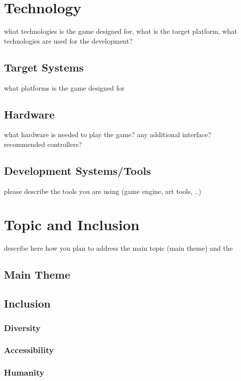 \documentclass[a4paper]{scrreprt}
\begin{document}
\chapter{Technology}
what technologies is the game designed for, what is the target platform, what technologies are used for the development?

\section{Target Systems}
what platforms is the game designed for

\section{Hardware}
what hardware is needed to play the game? any additional interface? recommended controllers?

\section{Development Systems/Tools}
please describe the tools you are using (game engine, art tools, ..)



\chapter{Topic and Inclusion }

describe here how you plan to address the main topic (main theme) and the

\section{Main Theme}
\section{Inclusion}

\subsection{Diversity}
\subsection{Accessibility}
\subsection{Humanity}
\end{document}
